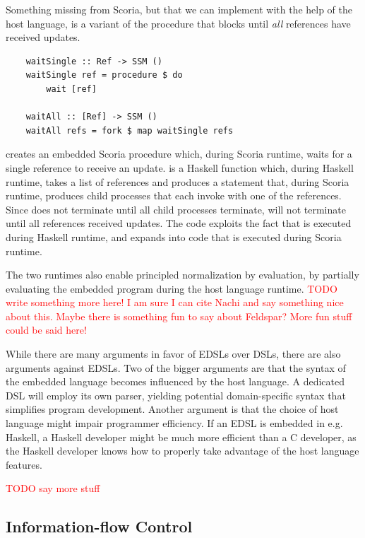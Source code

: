 Something missing from Scoria, but that we can implement with the help of the host language, is a variant of the
 procedure that blocks until \textit{all} references have received updates.

\begin{verbatim}
    waitSingle :: Ref -> SSM ()
    waitSingle ref = procedure $ do
        wait [ref]
    
    waitAll :: [Ref] -> SSM ()
    waitAll refs = fork $ map waitSingle refs
\end{verbatim}

 creates an embedded Scoria procedure which, during Scoria runtime, waits for a
single reference to receive an update.  is a Haskell function which, during Haskell runtime, takes a list of
references and produces a  statement that, during Scoria runtime, produces child processes that each
invoke  with one of the references. Since  does not terminate until all child processes
terminate,  will not terminate until all references received updates. The code exploits the fact that
 is executed during Haskell runtime, and expands into code that is executed during Scoria runtime.

The two runtimes also enable principled normalization by evaluation\cite{DBLP:conf/haskell/ValliappanRL21}, by partially evaluating the embedded program during the
host language runtime. \textcolor{red}{TODO write something more here! I am sure I can cite Nachi and say something nice about this. Maybe there
is something fun to say about Feldspar? More fun stuff could be said here!}

While there are many arguments in favor of EDSLs over DSLs, there are also arguments against EDSLs. Two of the bigger arguments
are that the syntax of the embedded language becomes influenced by the host language. A dedicated DSL will employ its own parser,
yielding potential domain-specific syntax that simplifies program development. Another argument is that the choice of host language
might impair programmer efficiency. If an EDSL is embedded in e.g. Haskell, a Haskell developer might be much more efficient
than a C developer, as the Haskell developer knows how to properly take advantage of the host language features.

\textcolor{red}{TODO say more stuff}

\subsection{Information-flow Control}

